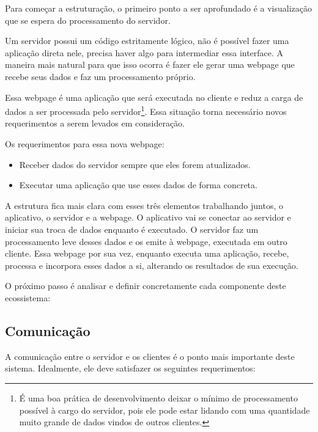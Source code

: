 \documentclass[a4paper,12pt]{article}
\begin{document}
Para começar a estruturação, o primeiro ponto a ser aprofundado é a visualização que se espera do processamento do servidor.

Um servidor possui um código estritamente lógico, não é possível fazer uma aplicação direta nele, precisa haver algo para intermediar essa interface. A maneira mais natural para que isso ocorra é fazer ele gerar uma webpage que recebe seus dados e faz um processamento próprio.

Essa webpage é uma aplicação que será executada no cliente e reduz a carga de dados a ser processada pelo servidor\footnote{É uma boa prática de desenvolvimento deixar o mínimo de processamento possível à cargo do servidor, pois ele pode estar lidando com uma quantidade muito grande de dados vindos de outros clientes.}. Essa situação torna necessário novos requerimentos a serem levados em consideração.

Os requerimentos para essa nova webpage:

\begin{itemize}

    \item Receber dados do servidor sempre que eles forem atualizados.

    \item Executar uma aplicação que use esses dados de forma concreta.

\end{itemize}

A estrutura fica mais clara com esses três elementos trabalhando juntos, o aplicativo, o servidor e a webpage. O aplicativo vai se conectar ao servidor e iniciar sua troca de dados enquanto é executado. O servidor faz um processamento leve desses dados e os emite à webpage, executada em outro cliente. Essa webpage por sua vez, enquanto executa uma aplicação, recebe, processa e incorpora esses dados a si, alterando os resultados de sua execução.

O próximo passo é analisar e definir concretamente cada componente deste ecossistema:





\subsection{Comunicação}

A comunicação entre o servidor e os clientes é o ponto mais importante deste sistema. Idealmente, ele deve satisfazer os seguintes requerimentos:
\end{document}

